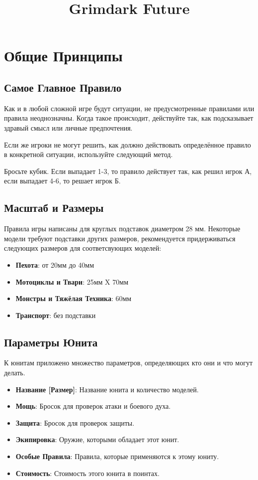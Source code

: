 \documentclass[twocolumn]{article}
\title{Grimdark Future}
\newcommand{\dicespan}[2]{\mbox{#1-#2}}
\newcommand{\h}[1]{\textbf{#1}}
\newcommand{\ssec}[1]{\section{#1}\label{sec:#1}}
\newcommand{\subsec}[1]{\subsection{#1}\label{subsec:#1}}
\begin{document}
\maketitle
\tableofcontents

\newpage

\ssec{Общие Принципы}
\subsec{Самое Главное Правило}

Как и в любой сложной игре будут ситуации, не предусмотренные правилами или правила неоднозначны. Когда такое происходит, действуйте так, как подсказывает здравый смысл или личные предпочтения.

Если же игроки не могут решить, как должно действовать определённое правило в конкретной ситуации, используйте следующий метод.

Бросьте кубик. Если выпадает \dicespan{1}{3}, то правило действует так, как решил игрок А, если выпадает \dicespan{4}{6}, то решает игрок Б.

\subsec{Масштаб и Размеры}
Правила игры написаны для круглых подставок диаметром 28 мм. Некоторые модели требуют подставки других размеров, рекомендуется придерживаться следующих размеров для соответсвующих моделей:

\begin{itemize}
    \item \h{Пехота}: от 20мм до 40мм
    \item \h{Мотоциклы и Твари}: 25мм X 70мм
    \item \h{Монстры и Тяжёлая Техника}: 60мм
    \item \h{Транспорт}: без подставки
\end{itemize}

\subsec{Параметры Юнита}
К юнитам приложено множество параметров, определяющих кто они и что могут делать.

\begin{itemize}
    \item \h{Название [Размер]}: Название юнита и количество моделей.
    \item \h{Мощь}: Бросок для проверок атаки и боевого духа.
    \item \h{Защита}: Бросок для проверок защиты.
    \item \h{Экипировка}: Оружие, которыми обладает этот юнит.
    \item \h{Особые Правила}: Правила, которые применяются к этому юниту.
    \item \h{Стоимость}: Стоимость этого юнита в поинтах.
\end{itemize}
\end{document}

